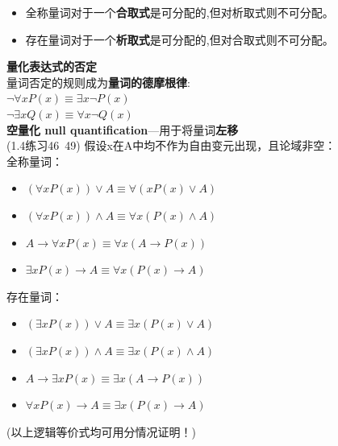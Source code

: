 \documentclass{article}
\begin{document}
    \begin{itemize}
        \item 全称量词对于一个\textbf{合取式}是可分配的,但对析取式则不可分配。
        \item 存在量词对于一个\textbf{析取式}是可分配的,但对合取式则不可分配。
    \end{itemize}
    \textbf{量化表达式的否定}\\
    量词否定的规则成为\textbf{量词的德摩根律}:\\
    $\neg \forall xP(x) \equiv \exists x \neg P(x)$ \\
    $\neg \exists xQ(x) \equiv \forall x \neg Q(x)$ \\
    \textbf{空量化 null quantification}---用于将量词\textbf{左移}\\
    (1.4练习46~49) 假设x在A中均不作为自由变元出现，且论域非空： \\
    全称量词：
    \begin{itemize}
        \item $(\forall xP(x)) \vee A \equiv \forall (xP(x) \vee A)$
        \item $(\forall xP(x))\wedge A \equiv \forall x(P(x)\wedge A)$
        \item $A \rightarrow \forall xP(x) \equiv \forall x(A \rightarrow P(x))$
        \item $\exists xP(x)\rightarrow A \equiv \forall x(P(x)\rightarrow A)$
    \end{itemize}
    存在量词：
    \begin{itemize}
        \item $(\exists xP(x))\vee A \equiv \exists x(P(x)\vee A)$
        \item $(\exists xP(x))\wedge A \equiv \exists x(P(x)\wedge A)$
        \item $A \rightarrow \exists xP(x) \equiv \exists x(A \rightarrow P(x))$
        \item $\forall xP(x)\rightarrow A \equiv \exists x(P(x)\rightarrow A)$
    \end{itemize}
    (以上逻辑等价式均可用分情况证明！)
\end{document}
